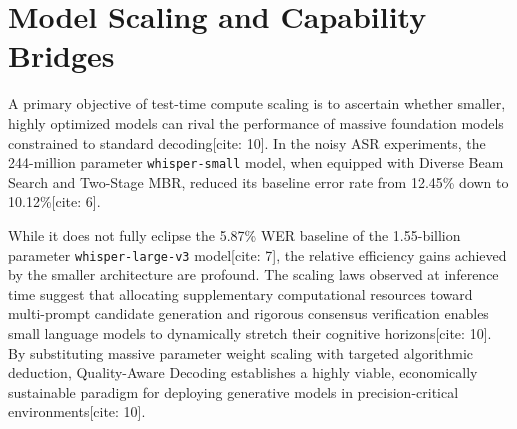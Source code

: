 \section{Model Scaling and Capability Bridges}
\label{sec:model_scaling}

A primary objective of test-time compute scaling is to ascertain whether smaller, highly optimized models can rival the performance of massive foundation models constrained to standard decoding[cite: 10]. In the noisy ASR experiments, the 244-million parameter \texttt{whisper-small} model, when equipped with Diverse Beam Search and Two-Stage MBR, reduced its baseline error rate from 12.45\% down to 10.12\%[cite: 6]. 

While it does not fully eclipse the 5.87\% WER baseline of the 1.55-billion parameter \texttt{whisper-large-v3} model[cite: 7], the relative efficiency gains achieved by the smaller architecture are profound. The scaling laws observed at inference time suggest that allocating supplementary computational resources toward multi-prompt candidate generation and rigorous consensus verification enables small language models to dynamically stretch their cognitive horizons[cite: 10]. By substituting massive parameter weight scaling with targeted algorithmic deduction, Quality-Aware Decoding establishes a highly viable, economically sustainable paradigm for deploying generative models in precision-critical environments[cite: 10].

